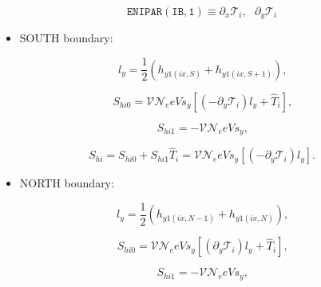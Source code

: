 \documentclass[11pt]{article}
\begin{document}
\bigskip

\begin{equation*}
\mathtt{ENIPAR(IB,1)}\equiv\partial_{x}\mathcal{T}_{i},\text{ }\partial _{y}%
\mathcal{T}_{i}
\end{equation*}

\bigskip

\begin{itemize}
\item  SOUTH boundary:
\end{itemize}

\bigskip

\begin{equation}
l_{y}=\frac{1}{2}\left( h_{y1\left( ix,S\right) }+h_{y1\left( ix,S+1\right)
}\right) \text{,}   \label{c234a}
\end{equation}

\begin{equation}
S_{hi0}=\mathcal{VN}_{e}eVs_{y}\left[ \left( -\partial_{y}\mathcal{T}%
_{i}\right) l_{y}+\widehat{T}_{i}\right] \text{,}   \label{c234}
\end{equation}

\begin{equation}
S_{hi1}=-\mathcal{VN}_{e}eVs_{y}\text{,}   \label{c235}
\end{equation}

\begin{equation}
S_{hi}=S_{hi0}+S_{hi1}\widehat{T}_{i}=\mathcal{VN}_{e}eVs_{y}\left[ \left(
-\partial_{y}\mathcal{T}_{i}\right) l_{y}\right] \text{.}   \label{c236}
\end{equation}

\bigskip

\begin{itemize}
\item  NORTH boundary:
\end{itemize}

\bigskip

\begin{equation}
l_{y}=\frac{1}{2}\left( h_{y1\left( ix,N-1\right) }+h_{y1\left( ix,N\right)
}\right) \text{,}   \label{c237a}
\end{equation}

\begin{equation}
S_{hi0}=\mathcal{VN}_{e}eVs_{y}\left[ \left( \partial_{y}\mathcal{T}%
_{i}\right) l_{y}+\widehat{T}_{i}\right] \text{,}   \label{c237}
\end{equation}

\begin{equation}
S_{hi1}=-\mathcal{VN}_{e}eVs_{y}\text{,}   \label{c238}
\end{equation}
\end{document}
